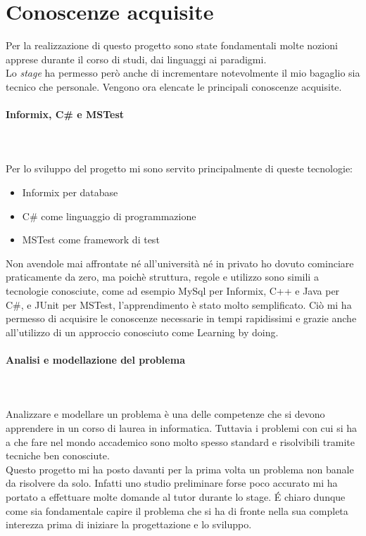 \section{Conoscenze acquisite}
\noindent Per la realizzazione di questo progetto sono state fondamentali
molte nozioni apprese durante il corso di studi, dai linguaggi ai paradigmi.\\
Lo \textit{stage} ha permesso però anche di incrementare notevolmente il mio bagaglio
sia tecnico che personale.
Vengono ora elencate le principali conoscenze acquisite.
\paragraph{Informix, C\# e MSTest}\hfill\\\\
\noindent Per lo sviluppo del progetto mi sono servito principalmente di queste tecnologie:
\begin{itemize}
    \item Informix per database
    \item C\# come linguaggio di programmazione
    \item MSTest come framework di test
\end{itemize}
\noindent Non avendole mai affrontate né all’università né in privato ho dovuto
cominciare praticamente da zero, ma poichè struttura, regole e utilizzo sono simili
a tecnologie conosciute, come ad esempio MySql per Informix, C++ e Java per C\#,
e JUnit per MSTest, l’apprendimento è stato molto semplificato.
Ciò mi ha permesso di acquisire le conoscenze necessarie in tempi rapidissimi
e grazie anche all'utilizzo di un approccio conosciuto come Learning
by doing.
\paragraph{Analisi e modellazione del problema}\hfill\\\\
Analizzare e modellare un problema è una delle competenze che si devono apprendere
in un corso di laurea in informatica. Tuttavia i problemi con cui si ha a che fare
nel mondo accademico sono molto spesso standard e risolvibili tramite tecniche
ben conosciute.\\
Questo progetto mi ha posto davanti per la prima volta un problema
non banale da risolvere da solo. Infatti uno studio preliminare forse poco accurato
mi ha portato a effettuare molte domande al tutor durante lo stage.
É chiaro dunque come sia fondamentale capire il problema che si ha di fronte nella
sua completa interezza prima di iniziare la progettazione e lo sviluppo.

